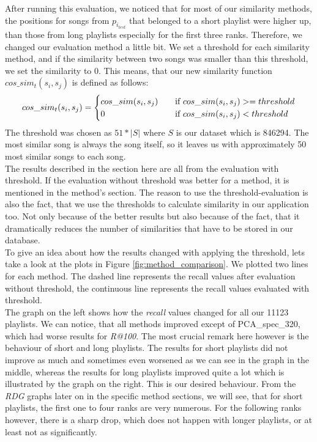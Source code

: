 After running this evaluation, we noticed that for most of our similarity methods, the positions for songs from $p_{i_{test}} $ that belonged to a short playlist were higher up, than those from long playlists especially for the first three ranks. Therefore, we changed our evaluation method a little bit. We set a threshold for each similarity method, and if the similarity between two songs was smaller than this threshold, we set the similarity to 0. This means, that our new similarity function $cos\_sim_t(s_i,s_j)$ is defined as follows: \[   
cos\_sim_t(s_i,s_j) = 
     \begin{cases}
       \text{$ cos\_sim(s_i,s_j) $} &\quad\text{if $ cos\_sim(s_i,s_j)  >= threshold$}\\
       \text{$ 0 $} &\quad\text{if $ cos\_sim(s_i,s_j)  < threshold$}\\
     \end{cases}
\]
 The threshold was chosen as $ 51 * |S| $ where $ S $ is our dataset which is 846294. The most similar song is always the song itself, so it leaves us with approximately 50 most similar songs to each song. \\
The results described in the section here are all from the evaluation with threshold. If the evaluation without threshold was better for a method, it is mentioned in the method's section. The reason to use the threshold-evaluation is also the fact, that we use the thresholds to calculate similarity in our application too. Not only because of the better results but also because of the fact, that it dramatically reduces the number of similarities that have to be stored in our database.\\
To give an idea about how the results changed with applying the threshold, lets take a look at the plots in Figure \ref{fig:method_comparison}. We plotted two lines for each method. The dashed line represents the recall values after evaluation without threshold, the continuous line represents the recall values evaluated with threshold. \\
The graph on the left shows how the \textit{recall} values changed for all our 11123 playlists. We can notice, that all methods improved except of PCA\_spec\_320, which had worse results for \textit{R@100}. The most crucial remark here however is the behaviour of short and long playlists. The results for short playlists did not improve as much and sometimes even worsened as we can see in the graph in the middle, whereas the results for long playlists improved quite a lot which is illustrated by the graph on the right. This is our desired behaviour. From the \textit{RDG} graphs later on in the specific method sections, we will see, that for short playlists, the first one to four ranks are very numerous. For the following ranks however, there is a sharp drop, which does not happen with longer playlists, or at least not as significantly. \\

